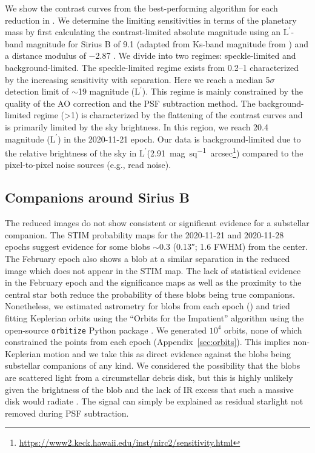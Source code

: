\documentclass[twocolumn]{aastex631}
\newcommand\Lp{$\mathrm{L}^\prime$}
\begin{document}
We show the contrast curves from the best-performing algorithm for each reduction in . We determine the limiting sensitivities in terms of the planetary mass by first calculating the contrast-limited absolute magnitude using an \Lp-band magnitude for Sirius B of 9.1 (adapted from Ks-band magnitude from \citealp{bonnet-bidaudADONISHighContrast2008a}) and a distance modulus of \num{-2.87} \citep{gaiacollaborationGaiaEarlyData2021}. We divide  into two regimes: speckle-limited and background-limited. The speckle-limited regime exists from \qtyrange{0.2}{1}{\au} characterized by the increasing sensitivity with separation. Here we reach a median 5$\sigma$ detection limit of $\sim$19 magnitude (\Lp). This regime is mainly constrained by the quality of the AO correction and the PSF subtraction method. The background-limited regime (\textgreater\qty{1}{\au}) is characterized by the flattening of the contrast curves and is primarily limited by the sky brightness. In this region, we reach 20.4 magnitude (\Lp) in the 2020-11-21 epoch. Our data is background-limited due to the relative brightness of the sky in \Lp (\qty{2.91}{mag\per sq. arcsec}\footnote{\url{https://www2.keck.hawaii.edu/inst/nirc2/sensitivity.html}}) compared to the pixel-to-pixel noise sources (e.g., read noise).

\subsection{Companions around Sirius B}

The reduced images do not show consistent or significant evidence for a substellar companion. The STIM probability maps for the 2020-11-21 and 2020-11-28 epochs suggest evidence for some blobs $\sim$\qty{0.3}{\au} (\ang{;;0.13}; 1.6 FWHM) from the center. The February epoch also shows a blob at a similar separation in the reduced image which does not appear in the STIM map. The lack of statistical evidence in the February epoch and the significance maps as well as the proximity to the central star both reduce the probability of these blobs being true companions. Nonetheless, we estimated astrometry for blobs from each epoch () and tried fitting Keplerian orbits using the ``Orbits for the Impatient'' algorithm \citep[OFTI;][]{bluntOrbitsImpatientBayesian2017a} using the open-source \texttt{orbitize} Python package \citep{bluntOrbitizeComprehensiveOrbitfitting2020}. We generated $10^4$ orbits, none of which constrained the points from each epoch (Appendix~\ref{sec:orbits}). This implies non-Keplerian motion and we take this as direct evidence against the blobs being substellar companions of any kind. We considered the possibility that the blobs are scattered light from a circumstellar debris disk, but this is highly unlikely given the brightness of the blob and the lack of IR excess that such a massive disk would radiate \citep{skemerSiriusImagedMidinfrared2011}. The signal can simply be explained as residual starlight not removed during PSF subtraction.
\end{document}

